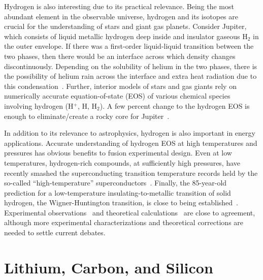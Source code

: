 Hydrogen is also interesting due to its practical relevance. Being the most abundant element in the observable universe, hydrogen and its isotopes are crucial for the understanding of stars and giant gas planets.
Consider Jupiter, which consists of liquid metallic hydrogen deep inside and insulator gaseous H$_2$ in the outer envelope. If there was a first-order liquid-liquid transition between the two phases, then there would be an interface across which density changes discontinuously.
Depending on the solubility of helium in the two phases, there is the possibility of helium rain across the interface and extra heat radiation due to this condensation~\cite{Militzer_thesis}.
Further, interior models of stars and gas giants rely on numerically accurate equation-of-state (EOS) of various chemical species involving hydrogen (H$^+$, H, H$_2$).
A few percent change to the hydrogen EOS is enough to eliminate/create a rocky core for Jupiter~\cite{Hubbard2016}.

In addition to its relevance to astrophysics, hydrogen is also important in energy applications. Accurate understanding of hydrogen EOS at high temperatures and pressures has obvious benefits to fusion experimental design.
Even at low temperatures, hydrogen-rich compounds, at sufficiently high pressures, have recently smashed the superconducting transition temperature records held by the so-called ``high-temperature'' superconductors~\cite{Drozdov2015,Errea2020}.
Finally, the 85-year-old prediction for a low-temperature insulating-to-metallic transition of solid hydrogen, the Wigner-Huntington transition, is close to being established~\cite{Wigner1935,Dias2016,Loubeyre2020}.
Experimental observations~\cite{Dias2016,Loubeyre2020} and theoretical calculations~\cite{McMinis2015,Gorelov2019} are close to agreement, although more experimental characterizations and theoretical corrections are needed to settle current debates.


\section{Lithium, Carbon, and Silicon}

